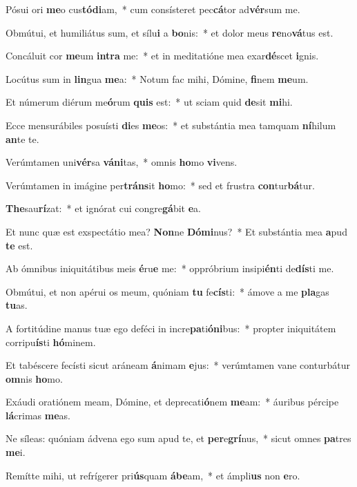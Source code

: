 \item Pósui ori \textbf{me}o cus\textbf{tó}\textbf{di}am,~* cum consísteret pec\textbf{cá}tor ad\textbf{vér}sum me.
\item Obmútui, et humiliátus sum, et sílu\textbf{i} a \textbf{bo}nis:~* et dolor meus \textbf{re}no\textbf{vá}tus est.
\item Concáluit cor \textbf{me}um \textbf{in}\textbf{tra} me:~* et in meditatióne mea exar\textbf{dé}scet \textbf{i}gnis.
\item Locútus sum in \textbf{lin}gua \textbf{me}a:~* Notum fac mihi, Dómine, \textbf{fi}nem \textbf{me}um.
\item Et númerum diérum me\textbf{ó}rum \textbf{quis} est:~* ut sciam quid \textbf{de}sit \textbf{mi}hi.
\item Ecce mensurábiles posuísti \textbf{di}es \textbf{me}os:~* et substántia mea tamquam \textbf{ní}hilum \textbf{an}te te.
\item Verúmtamen uni\textbf{vér}sa \textbf{vá}\textbf{ni}tas,~* omnis \textbf{ho}mo \textbf{vi}vens.
\item Verúmtamen in imágine per\textbf{tráns}it \textbf{ho}mo:~* sed et frustra \textbf{con}tur\textbf{bá}tur.
\item \textbf{The}sau\textbf{rí}zat:~* et ignórat cui congre\textbf{gá}bit \textbf{e}a.
\item Et nunc quæ est exspectátio mea? \textbf{Non}ne \textbf{Dó}\textbf{mi}nus?~* Et substántia mea \textbf{a}pud \textbf{te} est.
\item Ab ómnibus iniquitátibus meis \textbf{é}ru\textbf{e} me:~* oppróbrium insipi\textbf{én}ti de\textbf{dís}ti me.
\item Obmútui, et non apérui os meum, quóniam \textbf{tu} fe\textbf{cís}ti:~* ámove a me \textbf{pla}gas \textbf{tu}as.
\item A fortitúdine manus tuæ ego deféci in incre\textbf{pa}ti\textbf{ó}\textbf{ni}bus:~* propter iniquitátem corripu\textbf{ís}ti \textbf{hó}minem.
\item Et tabéscere fecísti sicut aráneam \textbf{á}nimam \textbf{e}jus:~* verúmtamen vane conturbátur \textbf{om}nis \textbf{ho}mo.
\item Exáudi oratiónem meam, Dómine, et deprecati\textbf{ó}nem \textbf{me}am:~* áuribus pércipe \textbf{lá}crimas \textbf{me}as.
\item Ne síleas: quóniam ádvena ego sum apud te, et \textbf{per}e\textbf{grí}nus,~* sicut omnes \textbf{pa}tres \textbf{me}i.
\item Remítte mihi, ut refrígerer pri\textbf{ús}quam \textbf{á}\textbf{be}am,~* et ámpli\textbf{us} non \textbf{e}ro.
